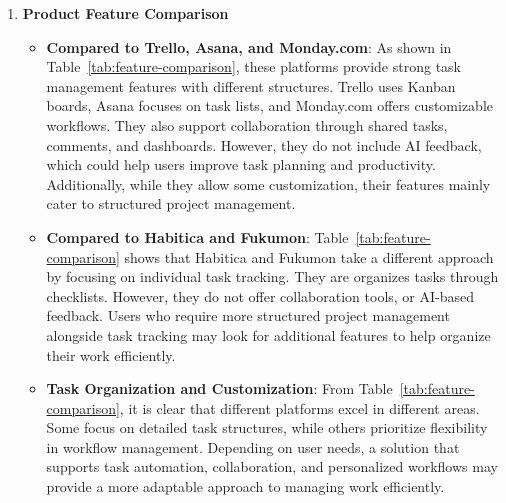 \begin{enumerate}
\begin{enumerate}
    \item \textbf{Fucumon} \\
    Fukumon is a gamified productivity app that gives rewards for completing tasks, as shown in Figure \ref{fig:Fucumon}. It helps users stay motivated by making work feel more enjoyable and engaging.
    \begin{figure}[H]
        \centering
        \texttt{[image: examples/Fucumon.png]}
        \caption{Fukumon}
        \label{fig:Fucumon}
    \end{figure}   
    \end{enumerate}
    \item \textbf{Product Feature Comparison}    
        \begin{itemize}
            \item \textbf{Compared to Trello, Asana, and Monday.com}:  
            As shown in Table~\ref{tab:feature-comparison}, these platforms provide strong task management features with different structures. Trello uses Kanban boards, Asana focuses on task lists, and Monday.com offers customizable workflows. They also support collaboration through shared tasks, comments, and dashboards. However, they do not include AI feedback, which could help users improve task planning and productivity. Additionally, while they allow some customization, their features mainly cater to structured project management.

            \item \textbf{Compared to Habitica and Fukumon}:  
            Table~\ref{tab:feature-comparison} shows that Habitica and Fukumon take a different approach by focusing on individual task tracking. They are organizes tasks through checklists. However, they do not offer collaboration tools, or AI-based feedback. Users who require more structured project management alongside task tracking may look for additional features to help organize their work efficiently.

            \item \textbf{Task Organization and Customization}:  
            From Table~\ref{tab:feature-comparison}, it is clear that different platforms excel in different areas. Some focus on detailed task structures, while others prioritize flexibility in workflow management. Depending on user needs, a solution that supports task automation, collaboration, and personalized workflows may provide a more adaptable approach to managing work efficiently.
        \end{itemize}


\end{enumerate}
